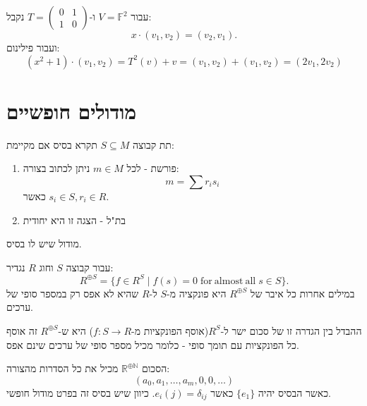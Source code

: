 \documentclass{tstextbook}
\begin{document}
\begin{example}
עבור \(V=\mathbb{F}^{2}\) ו-\(T=\begin{pmatrix}0&1\\1& 0\end{pmatrix}\) נקבל:
$$x\cdot\left(v_{1},v_{2}\right)=(v_{2},v_{1}).$$
ועבור פילינום:
$$\left(x^{2}+1\right)\cdot\left(v_{1},v_{2}\right)=T^{2}(v)+v=\left(v_{1},v_{2}\right)+\left(v_{1},v_{2}\right)=\left(2v_{1},2v_{2}\right)$$

\end{example}
\section{מודולים חופשיים}

\begin{definition}[בסיס]
תת קבוצה \(S\subseteq M\) תקרא בסיס אם מקיימת:

  \begin{enumerate}
    \item פורשת - לכל \(m \in M\) ניתן לכתוב בצורה: 
$$m=\sum r_{i}s_{i}$$
כאשר \(s_{i}\in S,r_{i}\in R\).


    \item בת"ל - הצגה זו היא יחודית 


  \end{enumerate}
\end{definition}
\begin{definition}
מודול שיש לו בסיס.

\end{definition}
\begin{definition}
עבור קבוצה \(S\) וחוג \(R\) נגדיר:
$$R^{\oplus S}=\{f\in R^{S}\mid f(s)=0\;{\mathrm{for~almost~all}}\;s\in S\}.$$
במילים אחרות כל איבר של \(R^{\oplus S}\) היא פונקציה מ-\(S\) ל-\(R\) שהיא לא אפס רק במספר סופי של ערכים.

\end{definition}
\begin{remark}
ההבדל בין הגדרה זו של סכום ישר ל-\(R^{S}\)(אוסף הפונקציות מ-\(f:S\to R\)) היא ש-\(R^{\oplus S}\) זה אוסף כל הפונקציות עם תומך סופי - כלומר מכיל מספר סופי של ערכים שינם אפס.

\end{remark}
\begin{example}
הסכום \(\mathbb{R}^{\oplus \mathbb{N}}\) מכיל את כל הסדרות מהצורה:
$$(a_{0},a_{1},\dots,a_{m}, 0,0,\dots)$$
כאשר הבסיס יהיה \(\{ e_{1} \}\) כאשר \(e_{i}(j)=\delta_{ij}\). כיוון שיש בסיס זה בפרט מודול חופשי.

\end{example}
\end{document}
